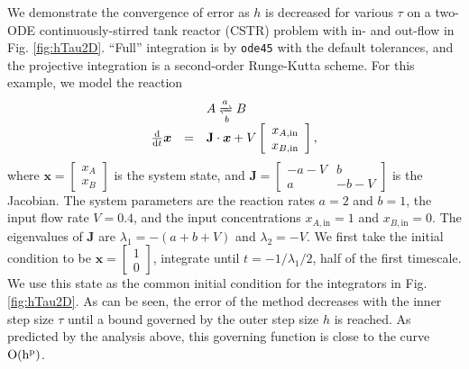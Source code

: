 \documentclass[numbers]{frontiersSCNS}
\renewcommand{\vec}[1]{\bm{#1}}
\newcommand{\mat}[1]{{\mathbf{#1}}}
\newcommand{\diff}{\mathrm{d}}  %
\newcommand{\figRef}[1]{Fig. \ref{fig:#1}}
\DeclareRobustCommand{\inTstep}{\tau}
\DeclareRobustCommand{\outTstep}{h}
\newcommand{\cstrVVal}{0.4}
\newcommand{\cstraVal}{2}
\newcommand{\cstrbVal}{1}
\newcommand{\cstrxAinVal}{1}
\newcommand{\cstrxBinVal}{0}
\newcommand{\cstrxAInitVal}{1}
\newcommand{\cstrxBInitVal}{0}
\begin{document}
We demonstrate the convergence of error as ${\outTstep}$ is decreased for various ${\inTstep}$
on a two-ODE continuously-stirred tank reactor (CSTR) problem with in- and out-flow
in \figRef{hTau2D}.
%
``Full'' integration is by \texttt{ode45} with the default tolerances,
and the projective integration is a second-order Runge-Kutta scheme.
%
For this example, we model the reaction
\begin{equation}
\begin{array}{rcl}
&& A \xrightleftharpoons[b]{a} B \\
\frac{\diff}{\diff t}
\vec x
&=&
\mat J
\cdot
\vec x
+V
\left[ \begin{array}{c} x_{A,\text{in}} \\ x_{B,\text{in}} \end{array} \right],
\end{array}
\end{equation}
where $\vec x = \left[ \begin{array}{c} x_A \\ x_B \end{array} \right]$ is the system state,
and
$\mat J = \left[ \begin{array}{cc} -a-V & b \\ a & -b-V \end{array} \right]$ is the Jacobian.
%
The system parameters are
the reaction rates $a=\cstraVal$ and $b=\cstrbVal$,
the input flow rate $V=\cstrVVal$,
and
the input concentrations $x_{A,\text{in}}=\cstrxAinVal$ and $x_{B,\text{in}}=\cstrxBinVal$.
%
The eigenvalues of $\mat J$ are
$\lambda_1 = -(a+b+V)$ and $\lambda_2=-V$.
%
We first take the initial condition to be $\vec x=\left[\begin{array}{c}\cstrxAInitVal \\ \cstrxBInitVal\end{array}\right]$,
integrate until $t=-1/\lambda_1/2$, half of the first timescale.
%
We use this state as the common initial condition for the integrators in \figRef{hTau2D}.
%
As can be seen, the error of the method decreases with the inner step size $\inTstep$
until a bound governed by the outer step size $\outTstep$ is reached.
%
As predicted by the analysis above, this governing function is close
to the curve $\rm O(\outTstep^p)$.
\end{document}
